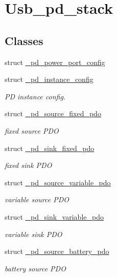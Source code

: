 \hypertarget{group__usb__pd__stack}{\section{Usb\-\_\-pd\-\_\-stack}
\label{group__usb__pd__stack}
}
\subsection*{Classes}
\begin{DoxyCompactItemize}
\item 
struct \hyperlink{struct__pd__power__port__config}{\-\_\-pd\-\_\-power\-\_\-port\-\_\-config}
\item 
struct \hyperlink{struct__pd__instance__config}{\-\_\-pd\-\_\-instance\-\_\-config}
\begin{DoxyCompactList}\small\item\em P\-D instance config. \end{DoxyCompactList}\item 
struct \hyperlink{struct__pd__source__fixed__pdo}{\-\_\-pd\-\_\-source\-\_\-fixed\-\_\-pdo}
\begin{DoxyCompactList}\small\item\em fixed source P\-D\-O \end{DoxyCompactList}\item 
struct \hyperlink{struct__pd__sink__fixed__pdo}{\-\_\-pd\-\_\-sink\-\_\-fixed\-\_\-pdo}
\begin{DoxyCompactList}\small\item\em fixed sink P\-D\-O \end{DoxyCompactList}\item 
struct \hyperlink{struct__pd__source__variable__pdo}{\-\_\-pd\-\_\-source\-\_\-variable\-\_\-pdo}
\begin{DoxyCompactList}\small\item\em variable source P\-D\-O \end{DoxyCompactList}\item 
struct \hyperlink{struct__pd__sink__variable__pdo}{\-\_\-pd\-\_\-sink\-\_\-variable\-\_\-pdo}
\begin{DoxyCompactList}\small\item\em variable sink P\-D\-O \end{DoxyCompactList}\item 
struct \hyperlink{struct__pd__source__battery__pdo}{\-\_\-pd\-\_\-source\-\_\-battery\-\_\-pdo}
\begin{DoxyCompactList}\small\item\em battery source P\-D\-O \end{DoxyCompactList}\item 

\end{DoxyCompactItemize}
